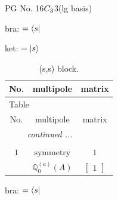 \documentclass[fleqn,8pt,landscape]{jsarticle}
\begin{document}
\setcounter{MaxMatrixCols}{32}

\renewcommand{\tablename}{Table~}
\renewcommand{\figurename}{Figure~}
\begin{center}
\LARGE
PG No. 16\quad$C_{\rm 3}$\quad$3$\quad[ trigonal ] (lg basis)
\end{center}
bra: $=\bra{s}$

\noindent
ket: $=\ket{s}$
\renewcommand{\arraystretch}{1.6}
\begin{longtable}{ccc}
\caption{(s,s) block.}
 \\
 \hline \hline
No. & multipole & matrix \\ \hline \endfirsthead

\multicolumn{2}{l}{\tablename\ \thetable{}} \\
 \hline \hline
No. & multipole & matrix \\ \hline \endhead

 \hline \hline
\multicolumn{2}{r}{\footnotesize\it continued ...} \\ \endfoot

 \hline \hline
\multicolumn{2}{r}{} \\ \endlastfoot

$ 1 $ & $ \text{symmetry} $ & $ 1 $ \\
$  $ & $ \mathbb{Q}_{0}^{(a)}(A) $ & $ \begin{bmatrix} 1 \end{bmatrix} $ \\ \hline
\end{longtable}
bra: $=\bra{s}$
\end{document}
